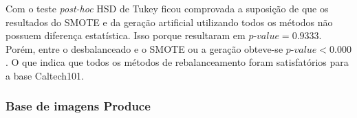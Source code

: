 
Com o teste \textit{post-hoc} HSD de Tukey ficou comprovada a suposição de que os resultados do SMOTE e da geração artificial utilizando todos os métodos não possuem diferença estatística. Isso porque resultaram em $\textit{p-value} = 0.9333$. Porém, entre o desbalanceado e o SMOTE ou a geração obteve-se $\textit{p-value} < 0.000$. O que indica que todos os métodos de rebalanceamento foram satisfatórios para a base Caltech101.


\subsubsection{Base de imagens Produce}


